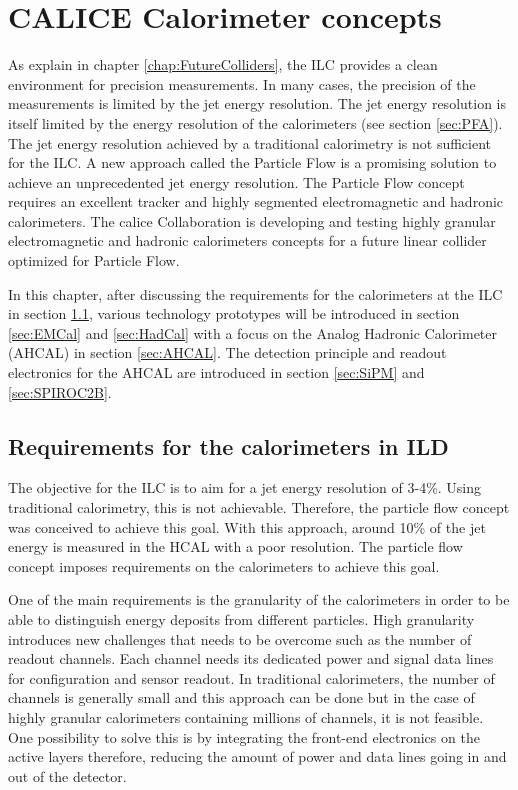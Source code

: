 \chapter{CALICE Calorimeter concepts}
\label{chap:CALICE_Det}

As explain in chapter \ref{chap:FutureColliders}, the ILC provides a clean environment for precision measurements. In many cases, the precision of the measurements is limited by the jet energy resolution. The jet energy resolution is itself limited by the energy resolution of the calorimeters (see section \ref{sec:PFA}). The jet energy resolution achieved by a traditional calorimetry is not sufficient for the ILC. A new approach called the Particle Flow is a promising solution to achieve an unprecedented jet energy resolution. The Particle Flow concept requires an excellent tracker and highly segmented electromagnetic and hadronic calorimeters. The \acrshort{calice} Collaboration is developing and testing highly granular electromagnetic and hadronic ca\-lo\-ri\-me\-ters concepts for a future linear collider optimized for Particle Flow.

In this chapter, after discussing the requirements for the calorimeters at the ILC in section \ref{sec:CaloRequirements}, various technology prototypes will be introduced in section \ref{sec:EMCal} and \ref{sec:HadCal} with a focus on the Analog Hadronic Calorimeter (AHCAL) in section \ref{sec:AHCAL}. The detection principle and readout electronics for the AHCAL are introduced in section \ref{sec:SiPM} and \ref{sec:SPIROC2B}.

\section{Requirements for the calorimeters in ILD}
\label{sec:CaloRequirements}

The objective for the ILC is to aim for a jet energy resolution of 3-4\%. Using traditional calorimetry, this is not achievable. Therefore, the particle flow concept was conceived to achieve this goal. With this approach, around 10\% of the jet energy is measured in the HCAL with a poor resolution. The particle flow concept imposes requirements on the calorimeters to achieve this goal.

One of the main requirements is the granularity of the calorimeters in order to be able to distinguish energy deposits from different particles. High granularity introduces new challenges that needs to be overcome such as the number of readout channels. Each channel needs its dedicated power and signal data lines for configuration and sensor readout. In traditional calorimeters, the number of channels is generally small and this approach can be done but in the case of highly granular calorimeters containing millions of channels, it is not feasible. One possibility to solve this is by integrating the front-end electronics on the active layers therefore, reducing the amount of power and data lines going in and out of the detector.

